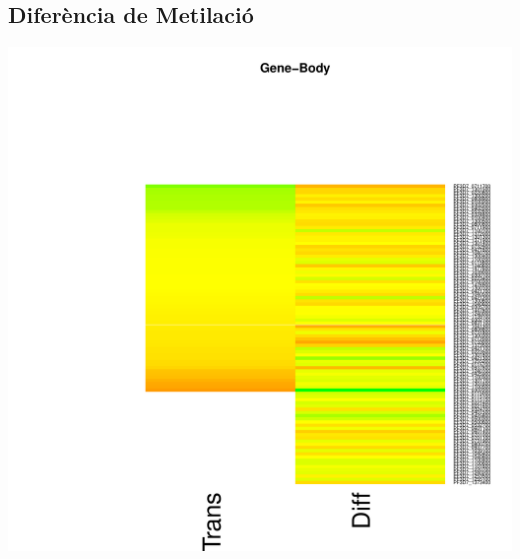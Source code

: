 \documentclass{article}\usepackage[]{graphicx}\usepackage[]{color}
\newenvironment{knitrout}{}{} %
\begin{document}
\subsection{Diferència de Metilació}
\begin{knitrout}
\color{fgcolor}

{\centering \includegraphics[width=.9\linewidth]{figure/minimal-heat_difpeak_cov_dif-1} 

}



\end{knitrout}
\clearpage
\end{document}
